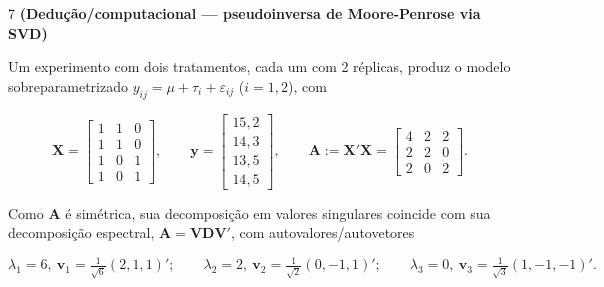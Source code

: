\documentclass[11pt]{article}
\begin{document}
\begin{questao}{7} \textbf{(Dedução/computacional --- pseudoinversa de Moore-Penrose via SVD)}

Um experimento com dois tratamentos, cada um com 2 réplicas, produz o modelo sobreparametrizado
$y_{ij} = \mu + \tau_i + \varepsilon_{ij}$ ($i=1,2$), com

$$
\mathbf{X} = \begin{bmatrix} 1&1&0\\1&1&0\\1&0&1\\1&0&1 \end{bmatrix}, \qquad
\mathbf{y} = \begin{bmatrix} 15{,}2\\14{,}3\\13{,}5\\14{,}5 \end{bmatrix}, \qquad
\mathbf{A} := \mathbf{X}'\mathbf{X} = \begin{bmatrix} 4&2&2\\2&2&0\\2&0&2 \end{bmatrix}.
$$

Como $\mathbf{A}$ é simétrica, sua decomposição em valores singulares coincide com sua
decomposição espectral, $\mathbf{A} = \mathbf{V}\mathbf{D}\mathbf{V}'$, com autovalores/autovetores

$$
\lambda_1 = 6,\ \mathbf{v}_1 = \tfrac{1}{\sqrt6}(2,1,1)'; \qquad
\lambda_2 = 2,\ \mathbf{v}_2 = \tfrac{1}{\sqrt2}(0,-1,1)'; \qquad
\lambda_3 = 0,\ \mathbf{v}_3 = \tfrac{1}{\sqrt3}(1,-1,-1)'.
$$


\end{questao}
\end{document}
